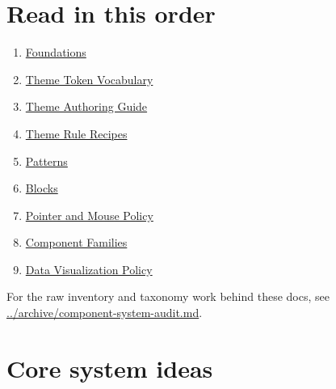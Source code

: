 \section{Read in this order}\label{record-017-read-in-this-order}

\begin{enumerate}
\def\labelenumi{\arabic{enumi}.}
\tightlist
\item
  \href{https://github.com/flyingrobots/bijou/blob/cbd70612140e7a450d764b3c7be1c6af878b99bc/docs/design-system/foundations.md}{Foundations}
\item
  \href{https://github.com/flyingrobots/bijou/blob/cbd70612140e7a450d764b3c7be1c6af878b99bc/docs/design-system/theme-tokens.md}{Theme Token Vocabulary}
\item
  \href{https://github.com/flyingrobots/bijou/blob/cbd70612140e7a450d764b3c7be1c6af878b99bc/docs/design-system/theme-authoring.md}{Theme Authoring Guide}
\item
  \href{https://github.com/flyingrobots/bijou/blob/cbd70612140e7a450d764b3c7be1c6af878b99bc/docs/design-system/theme-rule-recipes.md}{Theme Rule Recipes}
\item
  \href{https://github.com/flyingrobots/bijou/blob/cbd70612140e7a450d764b3c7be1c6af878b99bc/docs/design-system/patterns.md}{Patterns}
\item
  \href{https://github.com/flyingrobots/bijou/blob/cbd70612140e7a450d764b3c7be1c6af878b99bc/docs/design-system/blocks.md}{Blocks}
\item
  \href{https://github.com/flyingrobots/bijou/blob/cbd70612140e7a450d764b3c7be1c6af878b99bc/docs/design-system/pointer.md}{Pointer and Mouse Policy}
\item
  \href{https://github.com/flyingrobots/bijou/blob/cbd70612140e7a450d764b3c7be1c6af878b99bc/docs/design-system/component-families.md}{Component Families}
\item
  \href{https://github.com/flyingrobots/bijou/blob/cbd70612140e7a450d764b3c7be1c6af878b99bc/docs/design-system/data-visualization.md}{Data Visualization Policy}
\end{enumerate}

For the raw inventory and taxonomy work behind these docs, see \href{https://github.com/flyingrobots/bijou/blob/cbd70612140e7a450d764b3c7be1c6af878b99bc/docs/archive/component-system-audit.md}{../archive/component-system-audit.md}.

\section{Core system ideas}\label{record-017-core-system-ideas}

